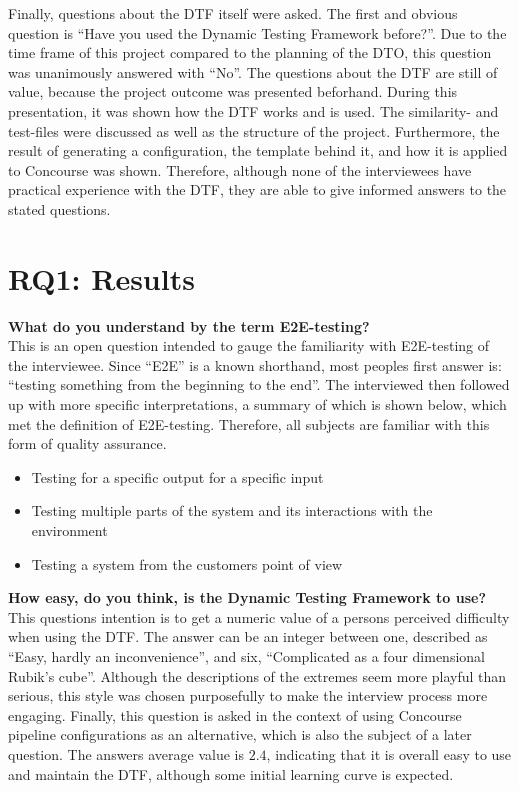 Finally, questions about the DTF itself were asked.
The first and obvious question is ``Have you used the Dynamic Testing Framework before?''.
Due to the time frame of this project compared to the planning of the DTO, this question was unanimously answered with ``No''.
The questions about the DTF are still of value, because the project outcome was presented beforhand.
During this presentation, it was shown how the DTF works and is used.
The similarity- and test-files were discussed as well as the structure of the project.
Furthermore, the result of generating a configuration, the template behind it, and how it is applied to Concourse was shown.
Therefore, although none of the interviewees have practical experience with the DTF, they are able to give informed answers to the stated questions.

\pagebreak

\section{RQ1: Results}\label{sec:q1:-results}

\textbf{What do you understand by the term E2E-testing?}\\
This is an open question intended to gauge the familiarity with E2E-testing of the interviewee.
Since ``E2E'' is a known shorthand, most peoples first answer is: ``testing something from the beginning to the end''.
The interviewed then followed up with more specific interpretations, a summary of which is shown below, which met the definition of E2E-testing.
Therefore, all subjects are familiar with this form of quality assurance.

\begin{itemize}
    \item Testing for a specific output for a specific input
    \item Testing multiple parts of the system and its interactions with the environment
    \item Testing a system from the customers point of view
\end{itemize}

\textbf{How easy, do you think, is the Dynamic Testing Framework to use?}\\
This questions intention is to get a numeric value of a persons perceived difficulty when using the DTF.
The answer can be an integer between one, described as ``Easy, hardly an inconvenience'', and six, ``Complicated as a four dimensional Rubik's cube''.
Although the descriptions of the extremes seem more playful than serious, this style was chosen purposefully to make the interview process more engaging.
Finally, this question is asked in the context of using Concourse pipeline configurations as an alternative, which is also the subject of a later question.
The answers average value is $2.4$, indicating that it is overall easy to use and maintain the DTF, although some initial learning curve is expected.

